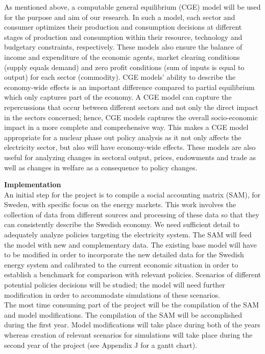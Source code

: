 As mentioned above, a computable general equilibrium (CGE) model will be used for the purpose and aim of our research. In such a model, each sector and consumer optimizes their production and consumption decisions at different stages of production and consumption within their resource, technology and budgetary constraints, respectively. These models also ensure the balance of income and expenditure of the economic agents, market clearing conditions (supply equals demand) and zero profit conditions (sum of inputs is equal to output) for each sector (commodity). CGE models' ability to describe the economy-wide effects is an important difference compared to partial equilibrium which only captures part of the economy. A CGE model can capture the repercussions that occur between different sectors and not only the direct impact in the sectors concerned; hence, CGE models captures the overall socio-economic impact in a more complete and comprehensive way. This makes a CGE model appropriate for a nuclear phase out policy analysis as it not only affects the electricity sector, but also will have economy-wide effects. These models are also useful for analyzing changes in sectoral output, prices, endowments and trade as well as changes in welfare as a consequence to policy changes.\\


\begin{comment}
Hydropower and nuclear power are subject to caps on production, at least in the short or medium term. The growth of hydropower is restricted and the restriction of the capacity of nuclear power is the target for the analysis. These types of capacity constraints are well suited to be modeled under the mixed complementarity framework \citep{raey}, which we will use for our proposed project.\\
\end{comment}
\textbf{Implementation}\\
An initial step for the project is to compile a social accounting matrix (SAM), for Sweden, with specific focus on the energy markets. This work involves the collection of data from different sources and processing of these data so that they can consistently describe the Swedish economy. We need sufficient detail to adequately analyze policies targeting the electricity system. The SAM will feed the model with new and complementary data.
The existing base model will have to be modified in order to incorporate the new detailed data for the Swedish energy system and calibrated to the current economic situation in order to establish a benchmark for comparison with relevant policies. Scenarios of different potential policies decisions will be studied; the model will need further modification in order to accommodate simulations of these scenarios.\\
The most time consuming part of the project will be the compilation of the SAM and model modifications. The compilation of the SAM will be accomplished during the first year. Model modifications will take place during both of the years whereas creation of relevant scenarios for simulations will take place during the second year of the project (see Appendix J for a gantt chart).\\

